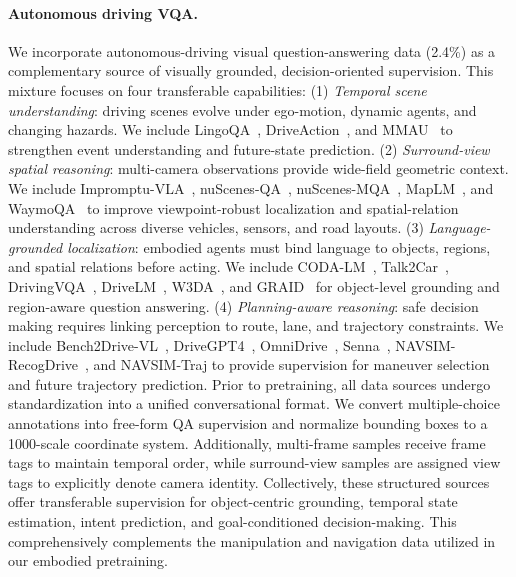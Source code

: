 \paragraph{Autonomous driving VQA.}
We incorporate autonomous-driving visual question-answering data (2.4\%) as a complementary source of visually grounded, decision-oriented supervision. This mixture focuses on four transferable capabilities: (1) \emph{Temporal scene understanding}: driving scenes evolve under ego-motion, dynamic agents, and changing hazards. We include LingoQA~\citep{marcu2024lingoqa}, DriveAction~\citep{hao2025driveaction}, and MMAU~\citep{fang2024abductive} to strengthen event understanding and future-state prediction. 
(2) \emph{Surround-view spatial reasoning}: multi-camera observations provide wide-field geometric context. We include Impromptu-VLA~\citep{chiimpromptu}, nuScenes-QA~\citep{qian2024nuscenes}, nuScenes-MQA~\citep{inoue2024nuscenes}, MapLM~\citep{cao2024maplm}, and WaymoQA~\citep{yu2025waymoqa} to improve viewpoint-robust localization and spatial-relation understanding across diverse vehicles, sensors, and road layouts. 
(3) \emph{Language-grounded localization}: embodied agents must bind language to objects, regions, and spatial relations before acting. We include CODA-LM~\citep{chen2025automated}, Talk2Car~\citep{deruyttere2019talk2car}, DrivingVQA~\cite{corbiere2025retrieval}, DriveLM~\citep{sima2024drivelm}, W3DA~\citep{zhou2025towards}, and GRAID~\citep{elmaaroufi2025graid} for object-level grounding and region-aware question answering. 
(4) \emph{Planning-aware reasoning}: safe decision making requires linking perception to route, lane, and trajectory constraints. We include Bench2Drive-VL~\citep{jia2026bench2drive}, DriveGPT4~\citep{xu2024drivegpt4}, OmniDrive~\citep{wang2025omnidrive}, Senna~\citep{jiang2024senna}, NAVSIM-RecogDrive~\citep{li2025recogdrive}, and NAVSIM-Traj to provide supervision for maneuver selection and future trajectory prediction. 
Prior to pretraining, all data sources undergo standardization into a unified conversational format. We convert multiple-choice annotations into free-form QA supervision and normalize bounding boxes to a 1000-scale coordinate system. Additionally, multi-frame samples receive frame tags to maintain temporal order, while surround-view samples are assigned view tags to explicitly denote camera identity. Collectively, these structured sources offer transferable supervision for object-centric grounding, temporal state estimation, intent prediction, and goal-conditioned decision-making. This comprehensively complements the manipulation and navigation data utilized in our embodied pretraining.

